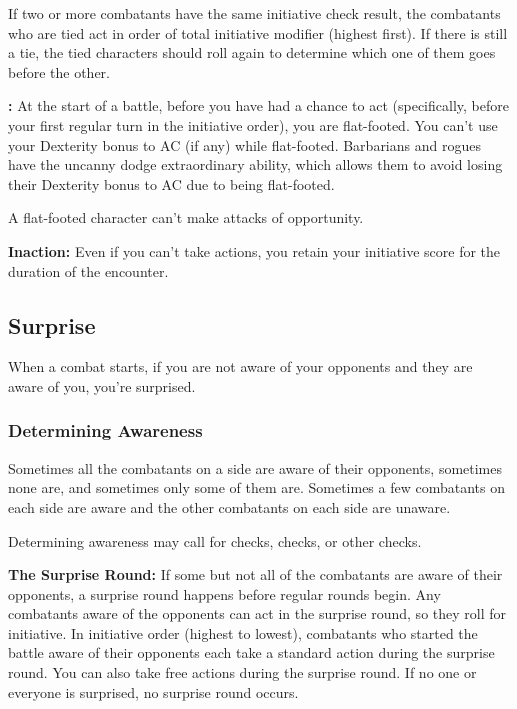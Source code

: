If two or more combatants have the same initiative check result, the combatants who are tied act in order of total initiative modifier (highest first). If there is still a tie, the tied characters should roll again to determine which one of them goes before the other.

\textbf{:} At the start of a battle, before you have had a chance to act (specifically, before your first regular turn in the initiative order), you are flat-footed. You can't use your Dexterity bonus to AC (if any) while flat-footed. Barbarians and rogues have the uncanny dodge extraordinary ability, which allows them to avoid losing their Dexterity bonus to AC due to being flat-footed.

A flat-footed character can't make attacks of opportunity.

\textbf{Inaction:} Even if you can't take actions, you retain your initiative score for the duration of the encounter.

\subsection{Surprise}

When a combat starts, if you are not aware of your opponents and they are aware of you, you're surprised.

\subsubsection{Determining Awareness}

Sometimes all the combatants on a side are aware of their opponents, sometimes none are, and sometimes only some of them are. Sometimes a few combatants on each side are aware and the other combatants on each side are unaware.

Determining awareness may call for  checks,  checks, or other checks.

\textbf{The Surprise Round:} If some but not all of the combatants are aware of their opponents, a surprise round happens before regular rounds begin. Any combatants aware of the opponents can act in the surprise round, so they roll for initiative. In initiative order (highest to lowest), combatants who started the battle aware of their opponents each take a standard action during the surprise round. You can also take free actions during the surprise round. If no one or everyone is surprised, no surprise round occurs.


